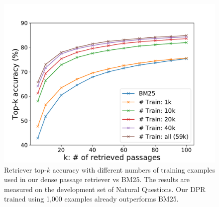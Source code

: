 \begin{figure}[!t]
    \center
    \includegraphics[scale=0.4,trim=0 0 0 40, clip]{figures/ir_training_examples_fig.pdf}
    \caption{Retriever top-$k$ accuracy with different numbers of training examples used in our dense passage retriever vs BM25. The results are measured on the development set of Natural Questions. Our DPR trained using 1,000 examples already outperforms BM25. }
    \label{fig:ir-training-examples}
\end{figure}
